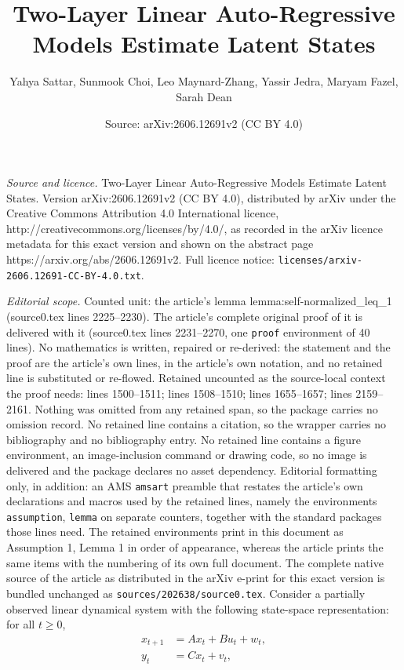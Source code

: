 \documentclass[10pt,a4paper]{amsart}
\title{Two-Layer Linear Auto-Regressive Models Estimate Latent States}
\author{Yahya Sattar, Sunmook Choi, Leo Maynard-Zhang, Yassir Jedra, Maryam Fazel, Sarah Dean}
\date{Source: arXiv:2606.12691v2 (CC BY 4.0)}
\begin{document}
\maketitle

\noindent\emph{Source and licence.} Two-Layer Linear Auto-Regressive Models Estimate Latent States. Version arXiv:2606.12691v2 (CC BY 4.0), distributed by arXiv under the Creative Commons Attribution 4.0 International licence, http://creativecommons.org/licenses/by/4.0/, as recorded in the arXiv licence metadata for this exact version and shown on the abstract page https://arxiv.org/abs/2606.12691v2. Full licence notice: \texttt{licenses/arxiv-2606.12691-CC-BY-4.0.txt}.\par\smallskip

\noindent\textit{Editorial scope.} Counted unit: the article's lemma lemma:self-normalized\_leq\_1 (source0.tex lines 2225--2230). The article's complete original proof of it is delivered with it (source0.tex lines 2231--2270, one \texttt{proof} environment of 40 lines). No mathematics is written, repaired or re-derived: the statement and the proof are the article's own lines, in the article's own notation, and no retained line is substituted or re-flowed.  Retained uncounted as the source-local context the proof needs: lines 1500--1511; lines 1508--1510; lines 1655--1657; lines 2159--2161.  Nothing was omitted from any retained span, so the package carries no omission record.  No retained line contains a citation, so the wrapper carries no bibliography and no bibliography entry.  No retained line contains a figure environment, an image-inclusion command or drawing code, so no image is delivered and the package declares no asset dependency.  Editorial formatting only, in addition: an AMS \texttt{amsart} preamble that restates the article's own declarations and macros used by the retained lines, namely the environments \texttt{assumption}, \texttt{lemma} on separate counters, together with the standard packages those lines need.  The retained environments print in this document as Assumption 1, Lemma 1 in order of appearance, whereas the article prints the same items with the numbering of its own full document.  The complete native source of the article as distributed in the arXiv e-print for this exact version is bundled unchanged as \texttt{sources/202638/source0.tex}.
Consider a partially observed linear dynamical system with the following state-space representation: for all $t \ge 0$, 
\begin{equation}
\begin{aligned}\label{eqn:linear sys}
	x_{t+1} &= A x_t + Bu_t + w_{t},\\
	y_t &= C x_t + v_t,
\end{aligned}
\end{equation}
\end{document}
